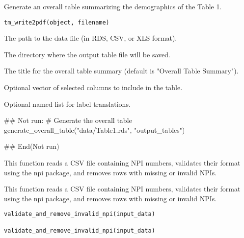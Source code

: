 \documentclass[a4paper]{book}
\begin{document}
%
\begin{Description}
Generate an overall table summarizing the demographics of the Table 1.
\end{Description}
%
\begin{Usage}
\begin{verbatim}
tm_write2pdf(object, filename)
\end{verbatim}
\end{Usage}
%
\begin{Arguments}
\begin{ldescription}
\item[\code{input\_file\_path}] The path to the data file (in RDS, CSV, or XLS format).

\item[\code{output\_directory}] The directory where the output table file will be saved.

\item[\code{title}] The title for the overall table summary (default is "Overall Table Summary").

\item[\code{selected\_columns}] Optional vector of selected columns to include in the table.

\item[\code{label\_translations}] Optional named list for label translations.
\end{ldescription}
\end{Arguments}
%
\begin{Examples}
\begin{ExampleCode}
## Not run: 
# Generate the overall table
generate_overall_table("data/Table1.rds", "output_tables")

## End(Not run)
\end{ExampleCode}
\end{Examples}
%
\begin{Description}
This function reads a CSV file containing NPI numbers, validates their
format using the npi package, and removes rows with missing or invalid NPIs.

This function reads a CSV file containing NPI numbers, validates their
format using the npi package, and removes rows with missing or invalid NPIs.
\end{Description}
%
\begin{Usage}
\begin{verbatim}
validate_and_remove_invalid_npi(input_data)

validate_and_remove_invalid_npi(input_data)
\end{verbatim}
\end{Usage}
\end{document}
